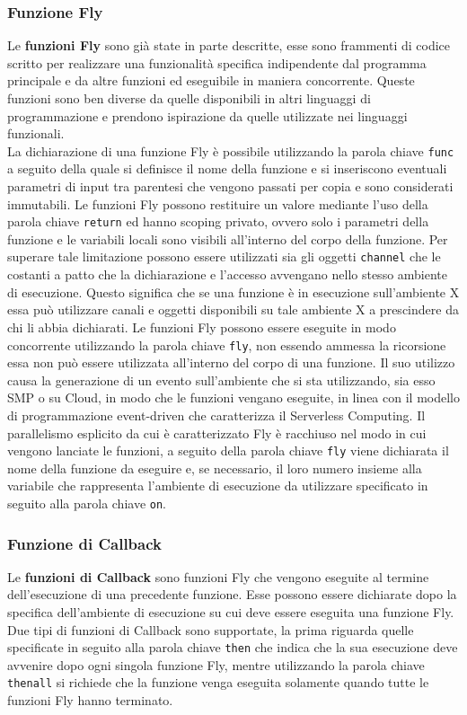 \subsubsection{Funzione Fly}
Le \textbf{funzioni Fly} sono già state in parte descritte, esse sono frammenti di codice scritto per realizzare una funzionalità specifica indipendente dal programma principale e da altre funzioni ed eseguibile in maniera concorrente. Queste funzioni sono ben diverse da quelle disponibili in altri linguaggi di programmazione e prendono ispirazione da quelle utilizzate nei linguaggi funzionali.\\
La dichiarazione di una funzione Fly è possibile utilizzando la parola chiave \verb|func| a seguito della quale si definisce il nome della funzione e si inseriscono eventuali parametri di input tra parentesi che vengono passati per copia e sono considerati immutabili. Le funzioni Fly possono restituire un valore mediante l'uso della parola chiave \verb|return| ed hanno scoping privato, ovvero solo i parametri della funzione e le variabili locali sono visibili all'interno del corpo della funzione. Per superare tale limitazione possono essere utilizzati sia gli oggetti \verb|channel| che le costanti a patto che la dichiarazione e l'accesso avvengano nello stesso ambiente di esecuzione. Questo significa che se una funzione è in esecuzione sull'ambiente X essa può utilizzare canali e oggetti disponibili su tale ambiente X a prescindere da chi li abbia dichiarati.
Le funzioni Fly possono essere eseguite in modo concorrente utilizzando la parola chiave \verb|fly|, non essendo ammessa la ricorsione essa non può essere utilizzata all'interno del corpo di una funzione. Il suo utilizzo causa la generazione di un evento sull’ambiente che si sta utilizzando, sia esso SMP o su Cloud, in modo che le funzioni vengano eseguite, in linea con il modello di programmazione event-driven che caratterizza il Serverless Computing. Il parallelismo esplicito da cui è caratterizzato Fly è racchiuso nel modo in cui vengono lanciate le funzioni, a seguito della parola chiave \verb|fly| viene dichiarata il nome della funzione da eseguire e, se necessario, il loro numero insieme alla variabile che rappresenta l'ambiente di esecuzione da utilizzare specificato in seguito alla parola chiave \verb|on|.

\subsubsection{Funzione di Callback}
Le \textbf{funzioni di Callback} sono funzioni Fly che vengono eseguite al termine dell'esecuzione di una precedente funzione. Esse possono essere dichiarate dopo la specifica dell'ambiente di esecuzione su cui deve essere eseguita una funzione Fly. Due tipi di funzioni di Callback sono supportate, la prima riguarda quelle specificate in seguito alla parola chiave \verb|then| che indica che la sua esecuzione deve avvenire dopo ogni singola funzione Fly, mentre utilizzando la parola chiave \verb|thenall| si richiede che la funzione venga eseguita solamente quando tutte le funzioni Fly hanno terminato.

